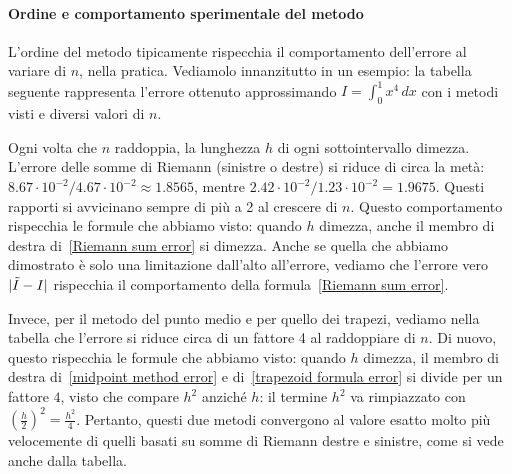 \documentclass[a4paper]{report}
\DeclarePairedDelimiter{\abs}{\lvert}{\rvert}
\theoremstyle{definition}
\theoremstyle{remark}
\newcommand{\checkkey}[1]{%
        \ifstrequal{#1}{inf}{\setbool{showcontent}{true}}{}%
    }
\newenvironment{conditional}[1][]{%
        \setbool{showcontent}{false}%
        \forcsvlist\checkkey{#1}%
        \ifbool{showcontent}{\begingroup}{\expandafter\comment}%
    }{%
        \ifbool{showcontent}{\endgroup}{\expandafter\endcomment}%
    }
\newcommand{\checkkey}[1]{%
        \ifstrequal{#1}{ich}{\setbool{showcontent}{true}}{}%
    }
\newenvironment{conditional}[1][]{%
        \setbool{showcontent}{false}%
        \forcsvlist\checkkey{#1}%
        \ifbool{showcontent}{\begingroup}{\expandafter\comment}%
    }{%
        \ifbool{showcontent}{\endgroup}{\expandafter\endcomment}%
    }
\begin{document}
\begin{conditional}[ich]
\paragraph{Ordine e comportamento sperimentale del metodo}
L'ordine del metodo tipicamente rispecchia il comportamento dell'errore al variare di $n$, nella pratica. Vediamolo innanzitutto in un esempio: la tabella seguente rappresenta l'errore ottenuto approssimando $I=\int_0^1 x^4 \, dx$ con i metodi visti e diversi valori di $n$.
%
\begin{center}
\end{center}
%
Ogni volta che $n$ raddoppia, la lunghezza $h$ di ogni sottointervallo dimezza. L'errore delle somme di Riemann (sinistre o destre) si riduce di circa la metà: $8.67\cdot 10^{-2} / 4.67 \cdot 10^{-2} \approx 1.8565$, mentre $2.42\cdot 10^{-2} / 1.23 \cdot 10^{-2} = 1.9675$. Questi rapporti si avvicinano sempre di più a 2 al crescere di $n$. Questo comportamento rispecchia le formule che abbiamo visto: quando $h$ dimezza, anche il membro di destra di~\eqref{Riemann sum error} si dimezza. Anche se quella che abbiamo dimostrato è solo una limitazione dall'alto all'errore, vediamo che l'errore vero $\abs{\tilde{I}-I}$ rispecchia il comportamento della formula~\eqref{Riemann sum error}.

Invece, per il metodo del punto medio e per quello dei trapezi, vediamo nella tabella che l'errore si riduce circa di un fattore 4 al raddoppiare di $n$. Di nuovo, questo rispecchia le formule che abbiamo visto: quando $h$ dimezza, il membro di destra di~\eqref{midpoint method error} e di~\eqref{trapezoid formula error} si divide per un fattore $4$, visto che compare $h^2$ anziché $h$: il termine $h^2$ va rimpiazzato con $\left(\frac{h}{2}\right)^2 = \frac{h^2}{4}$. Pertanto, questi due metodi convergono al valore esatto molto più velocemente di quelli basati su somme di Riemann destre e sinistre, come si vede anche dalla tabella.


\end{conditional}
\end{document}
